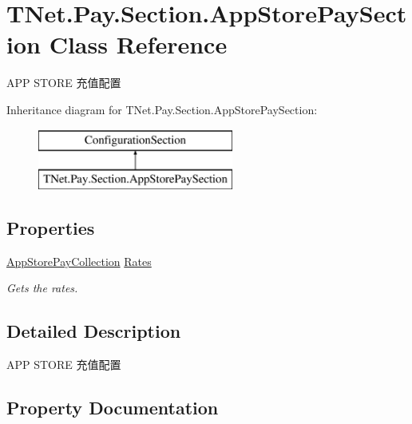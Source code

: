 \hypertarget{class_t_net_1_1_pay_1_1_section_1_1_app_store_pay_section}{}\section{T\+Net.\+Pay.\+Section.\+App\+Store\+Pay\+Section Class Reference}
\label{class_t_net_1_1_pay_1_1_section_1_1_app_store_pay_section}


A\+PP S\+T\+O\+RE 充值配置  


Inheritance diagram for T\+Net.\+Pay.\+Section.\+App\+Store\+Pay\+Section\+:\begin{figure}[H]
\begin{center}
\leavevmode
\includegraphics[height=2.000000cm]{class_t_net_1_1_pay_1_1_section_1_1_app_store_pay_section}
\end{center}
\end{figure}
\subsection*{Properties}
\begin{DoxyCompactItemize}
\item 
\mbox{\hyperlink{class_t_net_1_1_pay_1_1_section_1_1_app_store_pay_collection}{App\+Store\+Pay\+Collection}} \mbox{\hyperlink{class_t_net_1_1_pay_1_1_section_1_1_app_store_pay_section_a94a56f47c996c0992bb1fc6906f581e7}{Rates}}
\begin{DoxyCompactList}\small\item\em Gets the rates. \end{DoxyCompactList}\end{DoxyCompactItemize}


\subsection{Detailed Description}
A\+PP S\+T\+O\+RE 充值配置 



\subsection{Property Documentation}
\mbox{\label{class_t_net_1_1_pay_1_1_section_1_1_app_store_pay_section_a94a56f47c996c0992bb1fc6906f581e7}} 
